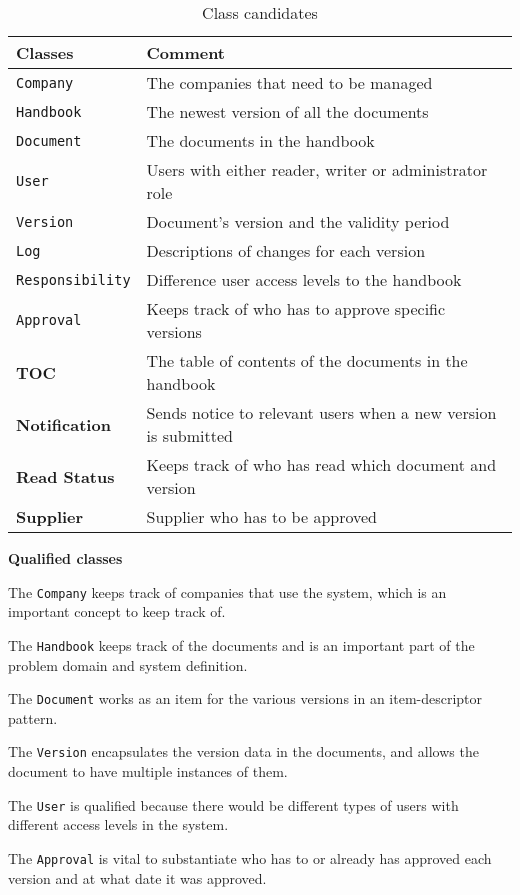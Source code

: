 \begin{table} [H]
\begin{tabular}{l l}
	\hline
	Classes & Comment\\
	\hline
	\texttt{Company} & The companies that need to be managed \\
	\texttt{Handbook} & The newest version of all the documents\\
	\texttt{Document} & The documents in the handbook\\
	\texttt{User }& Users with either reader, writer or administrator role\\
	\texttt{Version} & Document’s version and the validity period\\
	\texttt{Log} & Descriptions of changes for each version\\
	\texttt{Responsibility} & Difference user access levels to the handbook\\
	\texttt{Approval} & Keeps track of who has to approve specific
	versions\\
	\textbf{TOC} & The table of contents of the documents in the handbook\\
	\textbf{Notification} & Sends notice to relevant users when a new version is submitted\\
	\textbf{Read Status} & Keeps track of who has read which document and version\\
	\textbf{Supplier} & Supplier who has to be approved \\
	\hline
\end{tabular}
\caption{Class candidates}\label{tab:ClassCandidates}
\end{table}

\textbf{Qualified classes}

The \texttt{Company} keeps track of companies that use the system, which is an important concept to keep track of.

The \texttt{Handbook} keeps track of the documents and is an important part of the problem domain and system definition.

The \texttt{Document} works as an item for the various versions in an item-descriptor pattern.

The \texttt{Version} encapsulates the version data in the documents, and allows the document to have multiple instances of them.

The \texttt{User} is qualified because there would be different types of users with different access levels in the system.

The \texttt{Approval} is vital to substantiate who has to or already has approved each version and at what date it was approved.

